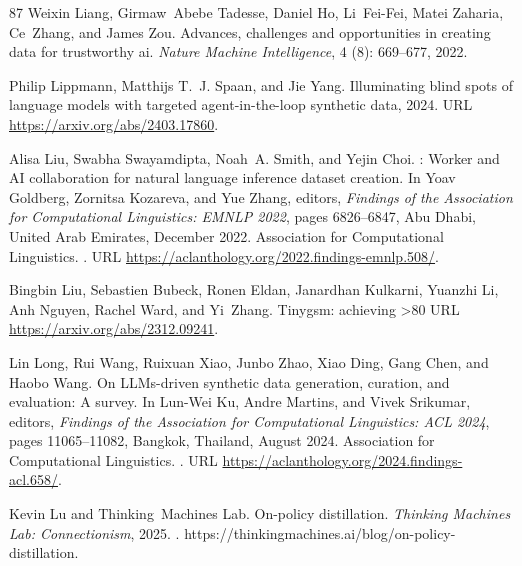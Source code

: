 \begin{thebibliography}{87}
Weixin Liang, Girmaw~Abebe Tadesse, Daniel Ho, Li~Fei-Fei, Matei Zaharia, Ce~Zhang, and James Zou.
\newblock Advances, challenges and opportunities in creating data for trustworthy ai.
\newblock \emph{Nature Machine Intelligence}, 4 (8): 669--677, 2022.

Philip Lippmann, Matthijs T.~J. Spaan, and Jie Yang.
\newblock Illuminating blind spots of language models with targeted agent-in-the-loop synthetic data, 2024.
\newblock URL \url{https://arxiv.org/abs/2403.17860}.

Alisa Liu, Swabha Swayamdipta, Noah~A. Smith, and Yejin Choi.
: Worker and {AI} collaboration for natural language inference dataset creation.
\newblock In Yoav Goldberg, Zornitsa Kozareva, and Yue Zhang, editors, \emph{Findings of the Association for Computational Linguistics: EMNLP 2022}, pages 6826--6847, Abu Dhabi, United Arab Emirates, December 2022. Association for Computational Linguistics.
\newblock {}.
\newblock URL \url{https://aclanthology.org/2022.findings-emnlp.508/}.

Bingbin Liu, Sebastien Bubeck, Ronen Eldan, Janardhan Kulkarni, Yuanzhi Li, Anh Nguyen, Rachel Ward, and Yi~Zhang.
\newblock Tinygsm: achieving >80%
\newblock URL \url{https://arxiv.org/abs/2312.09241}.

Lin Long, Rui Wang, Ruixuan Xiao, Junbo Zhao, Xiao Ding, Gang Chen, and Haobo Wang.
\newblock On {LLM}s-driven synthetic data generation, curation, and evaluation: A survey.
\newblock In Lun-Wei Ku, Andre Martins, and Vivek Srikumar, editors, \emph{Findings of the Association for Computational Linguistics: ACL 2024}, pages 11065--11082, Bangkok, Thailand, August 2024. Association for Computational Linguistics.
\newblock {}.
\newblock URL \url{https://aclanthology.org/2024.findings-acl.658/}.

Kevin Lu and Thinking~Machines Lab.
\newblock On-policy distillation.
\newblock \emph{Thinking Machines Lab: Connectionism}, 2025.
\newblock {}.
\newblock https://thinkingmachines.ai/blog/on-policy-distillation.


\end{thebibliography}

